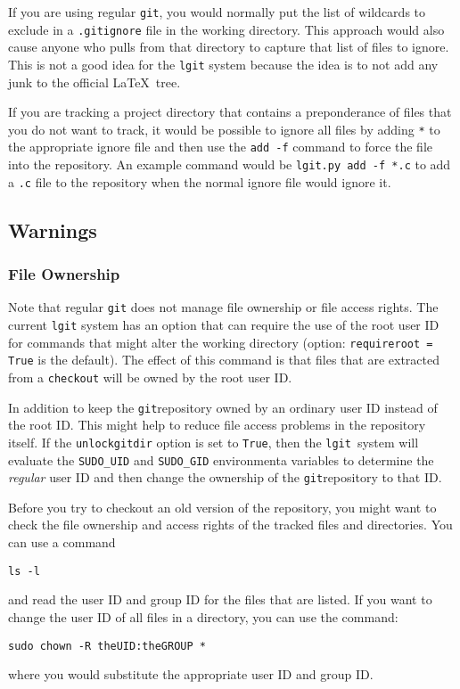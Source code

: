 \documentclass{ltxdoc}
\def\ucmd#1{{\tt {#1}}}
\def\lgit{{\tt lgit}}
\begin{document}
If you are using regular \ucmd{git}, you would normally put the list of wildcards to exclude in a \ucmd{.gitignore} file in the working directory. This approach would also cause anyone who pulls from that directory to capture that list of files to ignore.  This is not a good idea for the \ucmd{lgit} system because the idea is to not add any junk to the official \LaTeX\ tree.


If you are tracking a project directory that contains a preponderance of files that you do not want to track, it would be possible to ignore all files by adding \ucmd{*}  to the appropriate ignore file and then use the \ucmd{add -f} command to force the file into the repository.  An example command would be \ucmd{lgit.py add -f *.c} to add a \ucmd{.c} file to the repository when the normal ignore file would ignore it.

\subsection{Warnings}\label{warnings}
\subsubsection{File Ownership}
Note that regular \ucmd{git} does not manage file ownership or file access rights. The current \ucmd{lgit} system has an option that can require the use of the root user ID for commands that might alter the working directory (option: \ucmd{requireroot = True} is the default).  The effect of this command is that files that are extracted from a \ucmd{checkout} will be owned by the root user ID.

In addition to keep the \ucmd{git}repository owned by an ordinary user ID instead of the root ID. This might help to reduce file access problems in the repository itself. If the \ucmd{unlockgitdir} option is set to \ucmd{True}, then the \lgit\ system will evaluate the \ucmd{SUDO\_UID} and \ucmd{SUDO\_GID} environmenta variables to determine the \emph{regular} user ID and then change the ownership of the \ucmd{git}repository to that ID.

Before you try to checkout an old version of the repository, you might want to check the file ownership and access rights of the tracked files and directories.  You can use a command
\begin{verbatim}
ls -l
\end{verbatim}
and read the user ID and group ID for the files that are listed.  If you want to change the user ID of all files in a directory, you can use the command:
\begin{verbatim}
sudo chown -R theUID:theGROUP *
\end{verbatim}
where you would substitute the appropriate user ID and group ID.
\end{document}
